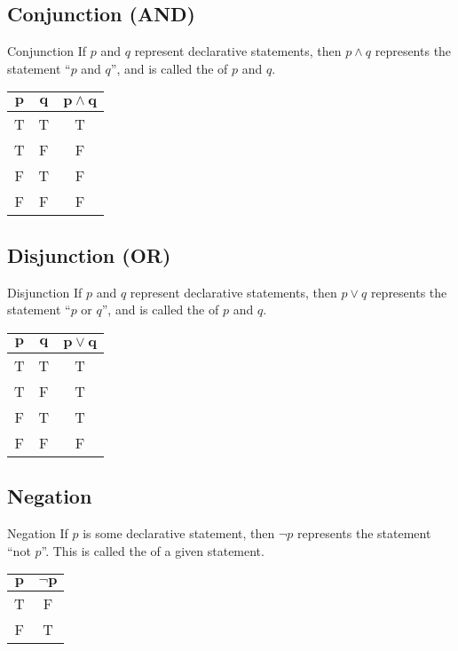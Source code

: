 \documentclass[\main/notes.tex]{subfiles}
\begin{document}
			\subsection[Conjunction]{Conjunction (AND)}
				\begin{definition}{Conjunction}
					If $p$ and $q$ represent declarative statements, then $p \land q$ represents the statement ``$p$ and $q$'', and is called the  of $p$ and $q$.
				\end{definition}
				\nopagebreak
				\begin{center}
					\begin{tabular}{|c c | c|}
						\hline
						$\mathbf{p}$ & $\mathbf{q}$ & $\mathbf{p \land q}$\\
						\hline
						T & T & T\\
						T & F & F\\
						F & T & F\\
						F & F & F\\
						\hline
					\end{tabular}	
				\end{center}
			\subsection[Disjunction]{Disjunction (OR)}
				\begin{definition}{Disjunction}
					If $p$ and $q$ represent declarative statements, then $p \lor q$ represents the statement ``$p$ or $q$'', and is called the  of $p$ and $q$.
				\end{definition}
				\nopagebreak
				\begin{center}
					\begin{tabular}{|c c | c|}
						\hline
						$\mathbf{p}$ & $\mathbf{q}$ & $\mathbf{p \lor q}$\\
						\hline
						T & T & T\\
						T & F & T\\
						F & T & T\\
						F & F & F\\
						\hline
					\end{tabular}	
				\end{center}
			\subsection{Negation}
				\begin{definition}{Negation}
					If $p$ is some declarative statement, then $\lnot p$ represents the statement ``not $p$''. This is called the  of a given statement.
				\end{definition}
				\nopagebreak
				\begin{center}
					\begin{tabular}{| c | c |}
						\hline
						$\mathbf{p}$ & $\mathbf{\lnot p}$\\
						\hline
						T & F\\
						F & T\\
						\hline
					\end{tabular}
				\end{center}
\end{document}
